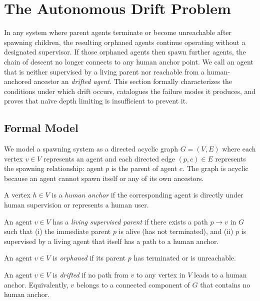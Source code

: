 \section{The Autonomous Drift Problem}

In any system where parent agents terminate or become unreachable after spawning children, the resulting orphaned agents continue operating without a designated supervisor. If those orphaned agents then spawn further agents, the chain of descent no longer connects to any human anchor point. We call an agent that is neither supervised by a living parent nor reachable from a human-anchored ancestor an \emph{drifted agent}. This section formally characterizes the conditions under which drift occurs, catalogues the failure modes it produces, and proves that na\"ive depth limiting is insufficient to prevent it.

\subsection{Formal Model}

We model a spawning system as a directed acyclic graph $G = (V, E)$ where each vertex $v \in V$ represents an agent and each directed edge $(p, c) \in E$ represents the spawning relationship: agent $p$ is the parent of agent $c$. The graph is acyclic because an agent cannot spawn itself or any of its own ancestors.

\begin{definition}\label{def:human_anchor}
A vertex $h \in V$ is a \emph{human anchor} if the corresponding agent is directly under human supervision or represents a human user.
\end{definition}

\begin{definition}\label{def:supervised_parent}
An agent $v \in V$ has a \emph{living supervised parent} if there exists a path $p \to v$ in $G$ such that (i) the immediate parent $p$ is alive (has not terminated), and (ii) $p$ is supervised by a living agent that itself has a path to a human anchor.
\end{definition}

\begin{definition}\label{def:orphaned}
An agent $v \in V$ is \emph{orphaned} if its parent $p$ has terminated or is unreachable.
\end{definition}

\begin{definition}\label{def:drifted}
An agent $v \in V$ is \emph{drifted} if no path from $v$ to any vertex in $V$ leads to a human anchor. Equivalently, $v$ belongs to a connected component of $G$ that contains no human anchor.
\end{definition}

